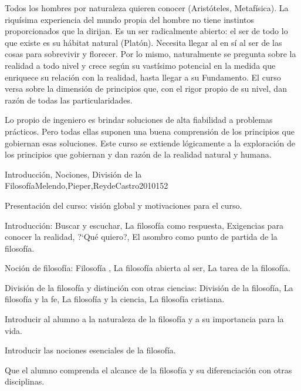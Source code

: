 \begin{syllabus}


\begin{justification}
Todos los hombres por naturaleza quieren conocer  (Aristóteles, Metafísica). La riquísima experiencia del mundo propia del hombre no tiene instintos proporcionados que la dirijan. Es un ser radicalmente abierto: el ser de todo lo que existe es su  hábitat  natural (Platón). Necesita llegar al  en sí al ser de las cosas para sobrevivir y florecer. Por lo mismo, naturalmente se pregunta sobre la realidad a todo nivel y crece según su vastísimo potencial en la medida que enriquece su relación con la realidad, hasta llegar a su Fundamento. El curso versa sobre la dimensión de principios que, con el rigor propio de su nivel, dan razón de todas las particularidades.
\end{justification}

\begin{goals}
\item Lo propio de ingeniero es brindar soluciones de alta fiabilidad a problemas prácticos. Pero todas ellas suponen una buena comprensión de los principios que gobiernan esas soluciones. Este curso se extiende lógicamente a la exploración de los principios que gobiernan y dan razón de la realidad natural y humana.
\end{goals}

\begin{outcomes}
\end{outcomes}

\begin{unit}{Introducción, Nociones, División de la Filosofía}{Melendo,Pieper,ReydeCastro2010}{15}{2}
\begin{topics}
	\item Presentación del curso: visión global y motivaciones para el curso.
	\item Introducción: Buscar y escuchar, La filosofía como respuesta, Exigencias para conocer la realidad, ?`Qué quiero?, El asombro como punto de partida de la filosofía.
	\item Noción de filosofía:  Filosofía , La filosofía abierta al ser, La tarea de la filosofía.
	\item División de la filosofía y distinción con otras ciencias: División de la filosofía, La filosofía y la fe, La filosofía y la ciencia,  La filosofía cristiana.
\end{topics}
\begin{unitgoals}
	\item Introducir al alumno a la naturaleza de la filosofía y a su importancia para la vida.
	\item Introducir las nociones esenciales de la filosofía.
	\item Que el alumno comprenda el alcance de la filosofía y su diferenciación con otras disciplinas.
\end{unitgoals}
\end{unit}


\end{syllabus}
